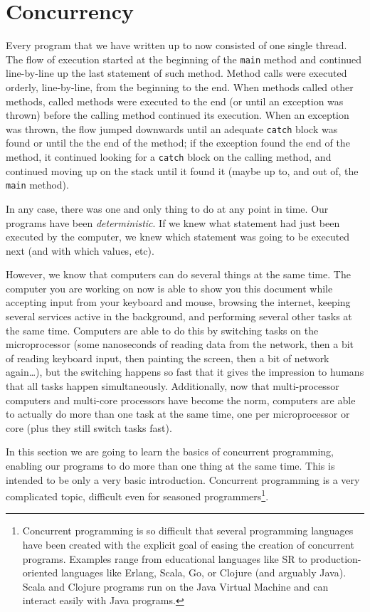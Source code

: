 \section{Concurrency}
\label{sec:concurrency}

Every program that we have written up to now consisted of one single
thread. The flow of execution started at the beginning of
the \verb+main+ method and continued line-by-line up the last
statement of such method. Method calls were executed orderly,
line-by-line, from the beginning to the end. When methods called other
methods, called methods were executed to the end (or until an
exception was thrown) before the calling method continued its
execution. When an exception was thrown, the flow jumped downwards
until an adequate \verb+catch+ block was found or until the the end of
the method; if the exception found the end of the method, it continued
looking for a \verb+catch+ block on the calling
method, and continued moving up on the stack until it found it 
(maybe up to, and out of, the \verb+main+ method). 

In any case, there was one and only thing to do at any point in
time. Our programs have been \emph{deterministic}. If we knew what
statement had just been executed by the computer, we knew which
statement was going to be executed next (and with which values, etc). 

However, we know that computers can do several things at the same
time. The computer you are working on now is able to show you this
document while accepting input from your keyboard and mouse, 
browsing the internet, 
keeping several services active in the background, and
performing several other tasks at the same time. 
Computers are able to do this by
switching tasks on the microprocessor (some nanoseconds of reading data from the
network, then a bit of reading keyboard input, then painting the
screen, then a bit of network again\ldots), but the switching happens so
fast that it gives the impression to humans that all tasks happen
simultaneously. Additionally, now that multi-processor computers and
multi-core processors have become the norm, computers are able to
actually do more than one task at the same time, one per
microprocessor or core (plus they still
switch tasks fast).

In this section we are going to learn the basics of concurrent
programming, enabling our programs to do more than one thing at the
same time. This is intended to be only a very basic
introduction. Concurrent programming is a very complicated topic,
difficult even
for seasoned programmers\footnote{Concurrent programming is so
  difficult that several programming languages have been 
  created with the explicit goal of easing the creation of concurrent
  programs. Examples range from educational languages like SR to
  production-oriented languages like Erlang, Scala, Go, or
  Clojure (and arguably Java). 
  Scala and Clojure programs run on the Java Virtual Machine and can
  interact easily with Java programs.}. 

